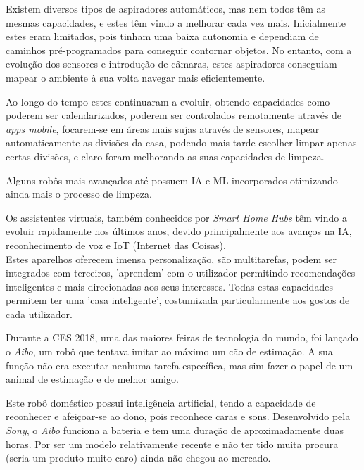 \documentclass[10pt]{article}
\begin{document}
Existem diversos tipos de aspiradores automáticos, mas nem todos têm as mesmas capacidades, e estes têm vindo a melhorar cada vez mais. Inicialmente estes eram limitados, pois tinham uma baixa autonomia e dependiam de caminhos pré-programados para conseguir contornar objetos. No entanto, com a evolução dos sensores e introdução de câmaras, estes aspiradores conseguiam mapear o ambiente à sua volta navegar mais eficientemente.

Ao longo do tempo estes continuaram a evoluir, obtendo capacidades como poderem ser calendarizados, poderem ser controlados remotamente através de \textit{apps mobile}, focarem-se em áreas mais sujas através de sensores, mapear automaticamente as divisões da casa, podendo mais tarde escolher limpar apenas certas divisões, e claro foram melhorando as suas capacidades de limpeza.

Alguns robôs mais avançados até possuem IA e ML incorporados otimizando ainda mais o processo de limpeza.

Os assistentes virtuais, também conhecidos por \textit{Smart Home Hubs} têm vindo a evoluir rapidamente nos últimos anos, devido principalmente aos avanços na IA, reconhecimento de voz e IoT (Internet das Coisas). \\
Estes aparelhos oferecem imensa personalização, são multitarefas, podem ser integrados com terceiros, 'aprendem' com o utilizador permitindo recomendações inteligentes e mais direcionadas aos seus interesses. Todas estas capacidades permitem ter uma 'casa inteligente', costumizada particularmente aos gostos de cada utilizador.

Durante a CES 2018, uma das maiores feiras de tecnologia do mundo, foi lançado o
\emph{Aibo}, um robô que tentava imitar ao máximo um cão de estimação. A sua função não era executar nenhuma tarefa específica, mas sim fazer o papel de um animal de estimação e de melhor amigo.

Este robô doméstico possui inteligência artificial, tendo a capacidade de reconhecer e afeiçoar-se ao dono, pois reconhece caras e sons. Desenvolvido
pela \emph{Sony}, o \emph{Aibo} funciona a bateria e tem uma duração de aproximadamente duas horas. Por ser um modelo relativamente recente e não ter tido muita procura (seria um produto muito caro) ainda não chegou ao mercado.
\end{document}

